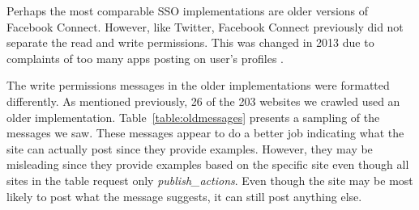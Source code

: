 \documentclass[10pt]{sig-alternate-10pt}
\begin{document}
Perhaps the most comparable SSO implementations are older versions of Facebook Connect. However, like Twitter, Facebook Connect previously did not separate the read and write permissions. This was changed in 2013 due to complaints of too many apps posting on user's profiles \cite{writeseparate}. 

The write permissions messages in the older implementations were formatted differently. As mentioned previously, 26 of the 203 websites we crawled used an older implementation. Table~\ref{table:oldmessages} presents a sampling of the messages we saw. These messages appear to do a better job indicating what the site can actually post since they provide examples. However, they may be misleading since they provide examples based on the specific site even though all sites in the table request only \emph{publish\_actions}. Even though the site may be most likely to post what the message suggests, it can still post anything else.
\end{document}
